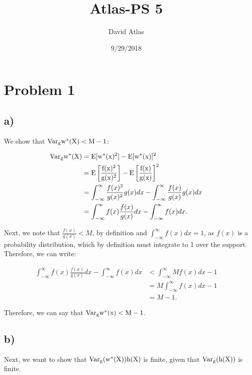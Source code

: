\documentclass[]{article}
\title{Atlas-PS 5}
\author{David Atlas}
\date{9/29/2018}
\begin{document}
\maketitle

\newcommand{\var}{\rm{Var}}
\newcommand{\E}{\rm{E}}





\section{Problem 1}\label{problem-1}

\subsection{a)}\label{a}

We show that \(\var_g{w^*(X)} < M -1\):

\begin{align*}
\var_g{w^*(X)} &= \E[w^*(x)^2] - \E[w^*(x)]^2 \\
&= \E\left[\frac{f(x)^2}{g(x)^2}\right] - \E\left[\frac{f(x)}{g(x)}\right]^2 \\ 
&= \int_{-\infty}^{\infty} \frac{f(x)^2}{g(x)^2} g(x) dx - \int_{-\infty}^{\infty} \frac{f(x)}{g(x)} g(x)dx \\
&= \int_{-\infty}^{\infty}  f(x) \frac{f(x)}{g(x)} dx - \int_{-\infty}^{\infty} f(x)dx.
\end{align*}

Next, we note that \(\frac{f(x)}{g(x)} < M\), by definition and
\(\int_{-\infty}^{\infty} f(x)dx = 1\), as \(f(x)\) is a probability
distribution, which by definition must integrate to 1 over the support.
Therefore, we can write:

\begin{align*}
\int_{-\infty}^{\infty}  f(x) \frac{f(x)}{g(x)} dx - \int_{-\infty}^{\infty} f(x)dx &< \int_{-\infty}^{\infty} M f(x)  dx - 1 \\
&= M \int_{-\infty}^{\infty}f(x)  dx - 1 \\
&= M - 1.
\end{align*}

Therefore, we can say that \(\var_g{w^*(x)} < M -1\).

\subsection{b)}\label{b}

Next, we want to show that \(\var_g(w^*(X))h(X)\) is finite, given that
\(\var_g(h(X))\) is finite.
\end{document}
